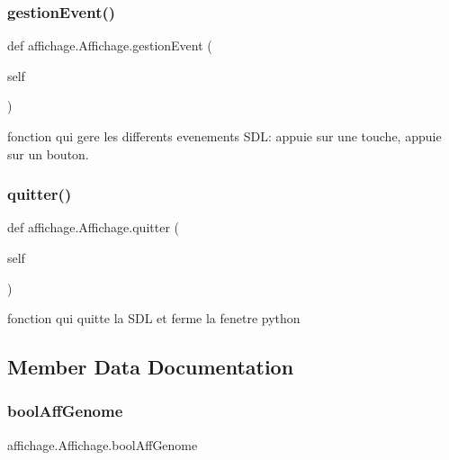 \mbox{\label{classaffichage_1_1_affichage_a3ad2f7f2c22a2ff4863af09fd1b3ecd3}} 
\subsubsection{\texorpdfstring{gestion\+Event()}{gestionEvent()}}
{\footnotesize\ttfamily def affichage.\+Affichage.\+gestion\+Event (\begin{DoxyParamCaption}\item[{}]{self }\end{DoxyParamCaption})}



fonction qui gere les differents evenements S\+DL\+: appuie sur une touche, appuie sur un bouton. 

\mbox{\label{classaffichage_1_1_affichage_a72099522a0eabcb0be314bc912a2004e}} 
\subsubsection{\texorpdfstring{quitter()}{quitter()}}
{\footnotesize\ttfamily def affichage.\+Affichage.\+quitter (\begin{DoxyParamCaption}\item[{}]{self }\end{DoxyParamCaption})}



fonction qui quitte la S\+DL et ferme la fenetre python 



\subsection{Member Data Documentation}
\mbox{\label{classaffichage_1_1_affichage_a5ae8cd3838187cd4b0ebab27b1da1e16}} 
\subsubsection{\texorpdfstring{bool\+Aff\+Genome}{boolAffGenome}}
{\footnotesize\ttfamily affichage.\+Affichage.\+bool\+Aff\+Genome}



